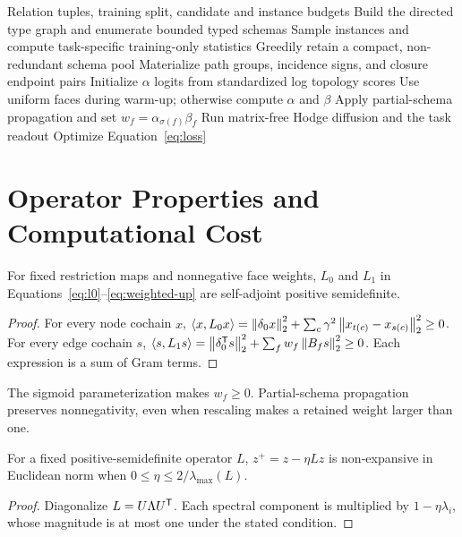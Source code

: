 \begin{algorithm}[t]
  \caption{\ampss{} preprocessing and refinement}
  \label{alg:ampss}
  \begin{algorithmic}[1]
    \REQUIRE Relation tuples, training split, candidate and instance budgets
    \STATE Build the directed type graph and enumerate bounded typed schemas
    \STATE Sample instances and compute task-specific training-only statistics
    \STATE Greedily retain a compact, non-redundant schema pool
    \STATE Materialize path groups, incidence signs, and closure endpoint pairs
    \STATE Initialize $\alpha$ logits from standardized log topology scores
      \STATE Use uniform faces during warm-up; otherwise compute $\alpha$ and $\beta$
      \STATE Apply partial-schema propagation and set $w_f=\alpha_{\sigma(f)}\beta_f$
      \STATE Run matrix-free Hodge diffusion and the task readout
      \STATE Optimize Equation~\ref{eq:loss}
    \ENDFOR
  \end{algorithmic}
\end{algorithm}

\section{Operator Properties and Computational Cost}
\label{sec:analysis}

\begin{proposition}
For fixed restriction maps and nonnegative face weights, $L_0$ and $L_1$ in
Equations~\ref{eq:l0}--\ref{eq:weighted-up} are self-adjoint positive semidefinite.
\end{proposition}
\begin{proof}
For every node cochain $x$,
$\langle x,L_0x\rangle=\left\lVert \delta_0x\right\rVert_2^2+
\sum_c\gamma^2\left\lVert x_{t(c)}-x_{s(c)}\right\rVert_2^2\geq0$.
For every edge cochain $s$,
$\langle s,L_1s\rangle=\left\lVert \delta_0^{\mathsf{T}}s\right\rVert_2^2+
\sum_f w_f\left\lVert B_f s\right\rVert_2^2\geq0$. Each expression is a sum of Gram terms.
\end{proof}

The sigmoid parameterization makes $w_f\geq0$. Partial-schema propagation preserves
nonnegativity, even when rescaling makes a retained weight larger than one.

\begin{proposition}
For a fixed positive-semidefinite operator $L$, $z^+=z-\eta Lz$ is non-expansive in Euclidean norm
when $0\leq\eta\leq2/\lambda_{\max}(L)$.
\end{proposition}
\begin{proof}
Diagonalize $L=U\Lambda U^{\mathsf{T}}$. Each spectral component is multiplied by
$1-\eta\lambda_i$, whose magnitude is at most one under the stated condition.
\end{proof}

